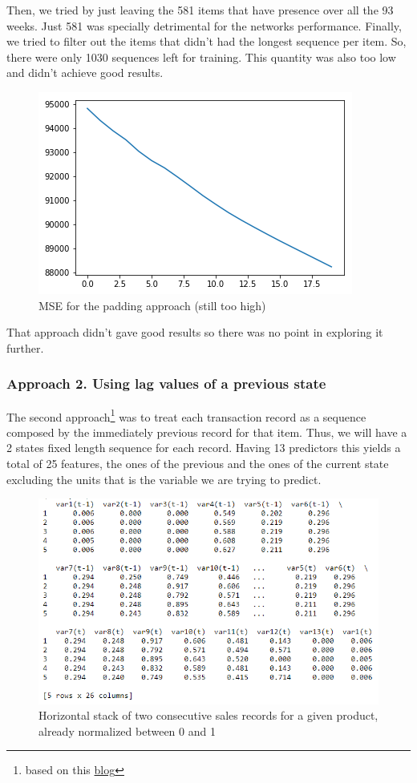 \documentclass[]{article}
\let\rmarkdownfootnote\footnote%
\def\footnote{\protect\rmarkdownfootnote}
\theoremstyle{definition}
\theoremstyle{definition}
\theoremstyle{definition}
\theoremstyle{remark}
\begin{document}
Then, we tried by just leaving the 581 items that have presence over all
the 93 weeks. Just 581 was specially detrimental for the networks
performance. Finally, we tried to filter out the items that didn't had
the longest sequence per item. So, there were only 1030 sequences left
for training. This quantity was also too low and didn't achieve good
results.

\begin{figure}

{\centering \includegraphics[width=0.3\linewidth]{./media/app2.2} 

}

\caption{MSE for the padding approach (still too high)}\label{fig:fig2}
\end{figure}

That approach didn't gave good results so there was no point in
exploring it further.

\subsubsection{Approach 2. Using lag values of a previous
state}\label{approach-2.-using-lag-values-of-a-previous-state}

The second approach\footnote{based on this
  \href{https://machinelearningmastery.com/multivariate-time-series-forecasting-lstms-keras/}{blog}}
was to treat each transaction record as a sequence composed by the
immediately previous record for that item. Thus, we will have a 2 states
fixed length sequence for each record. Having 13 predictors this yields
a total of 25 features, the ones of the previous and the ones of the
current state excluding the units that is the variable we are trying to
predict.

\begin{figure}

{\centering \includegraphics[width=0.5\linewidth]{./media/example_representation2} 

}

\caption{Horizontal stack of two consecutive sales records for a given product, already normalized between 0 and 1}\label{fig:fig4}
\end{figure}
\end{document}
